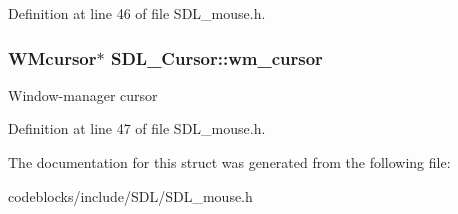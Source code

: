 Definition at line 46 of file S\+D\+L\+\_\+mouse.\+h.

\hypertarget{structSDL__Cursor_ab133c48a66abe3831e5ad18467d9ef3d}{
\subsubsection[{wm\+\_\+cursor}]{\setlength{\rightskip}{0pt plus 5cm}W\+Mcursor$\ast$ S\+D\+L\+\_\+\+Cursor\+::wm\+\_\+cursor}}\label{structSDL__Cursor_ab133c48a66abe3831e5ad18467d9ef3d}
Window-\/manager cursor 

Definition at line 47 of file S\+D\+L\+\_\+mouse.\+h.



The documentation for this struct was generated from the following file\+:\begin{DoxyCompactItemize}
\item 
codeblocks/include/\+S\+D\+L/S\+D\+L\+\_\+mouse.\+h\end{DoxyCompactItemize}
